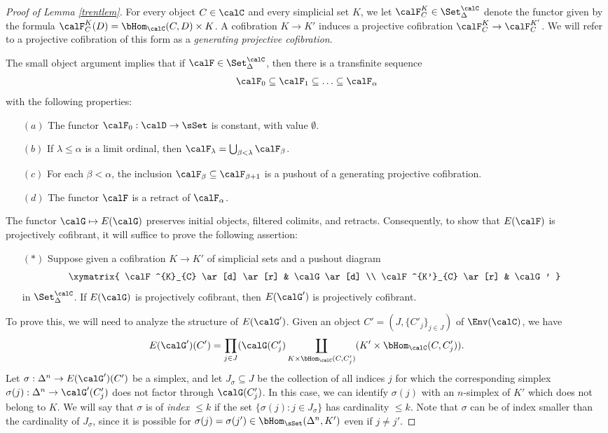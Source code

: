 \begin{proof}[Proof of Lemma \ref{trentlem}]
For every object $C \in \calC$ and every simplicial set $K$, we let 
$\calF^{K}_{C} \in \Set_{\Delta}^{\calC}$ denote the functor given by the formula
$\calF^{K}_{C}(D) = \bHom_{\calC}( C, D) \times K$. A cofibration $K \rightarrow K'$ induces
a projective cofibration $\calF^{K}_{C} \rightarrow \calF^{K'}_{C}$. We will refer to a projective cofibration of this form as a {\em generating projective cofibration}.

The small object argument implies that if $\calF \in \Set_{\Delta}^{\calC}$, then there is a transfinite sequence
$$ \calF_0 \subseteq \calF_{1} \subseteq \ldots \subseteq \calF_{\alpha}$$
with the following properties:
\begin{itemize}
\item[$(a)$] The functor $\calF_0: \calD \rightarrow \sSet$ is constant, with value $\emptyset$.
\item[$(b)$] If $\lambda \leq \alpha$ is a limit ordinal, then $\calF_{\lambda} = \bigcup_{ \beta < \lambda} \calF_{\beta}$.
\item[$(c)$] For each $\beta < \alpha$, the inclusion $\calF_{\beta} \subseteq \calF_{\beta+1}$ is a pushout of a generating projective cofibration.
\item[$(d)$] The functor $\calF$ is a retract of $\calF_{\alpha}$.
\end{itemize}

The functor $\calG \mapsto E(\calG)$ preserves initial objects, filtered colimits, and retracts. Consequently, to show that $E(\calF)$ is projectively cofibrant, it will suffice to prove the following 
assertion:
\begin{itemize}
\item[$(\ast)$] Suppose given a cofibration $K \rightarrow K'$ of simplicial sets and a pushout diagram
$$ \xymatrix{ \calF^{K}_{C} \ar[d] \ar[r] & \calG \ar[d] \\
\calF^{K'}_{C} \ar[r] & \calG' }$$
in $\Set_{\Delta}^{\calC}$. If $E(\calG)$ is projectively cofibrant, then $E(\calG')$ is projectively cofibrant.
\end{itemize}

To prove this, we will need to analyze the structure of $E(\calG')$. Given an object
$C' = ( J, \{ C'_{j} \}_{j \in J} )$ of $\Env(\calC)$, we have
$$E(\calG')( C' ) = \prod_{j \in J} ( \calG( C'_{j} ) \coprod_{ K \times \bHom_{\calC}(C,C'_j) }
( K' \times \bHom_{\calC}(C, C'_j) ). $$
Let $\sigma: \Delta^n \rightarrow E(\calG')(C')$ be a simplex, and let $J_{\sigma} \subseteq J$
be the collection of all indices $j$ for which the corresponding simplex 
$\sigma(j): \Delta^n \rightarrow \calG'(C'_j)$ does not factor through $\calG(C'_j)$. 
In this case, we can identify $\sigma(j)$ with an $n$-simplex of $K'$ which does not belong to
$K$. We will say that $\sigma$ is of {\it index $\leq k$} if the set $\{ \sigma(j) : j \in J_{\sigma} \}$ has cardinality $\leq k$. Note that $\sigma$ can be of index smaller than the cardinality of
$J_{\sigma}$, since it is possible for $\sigma(j) = \sigma(j') \in \bHom_{\sSet}(\Delta^n, K')$ even if $j \neq j'$.


\end{proof}
